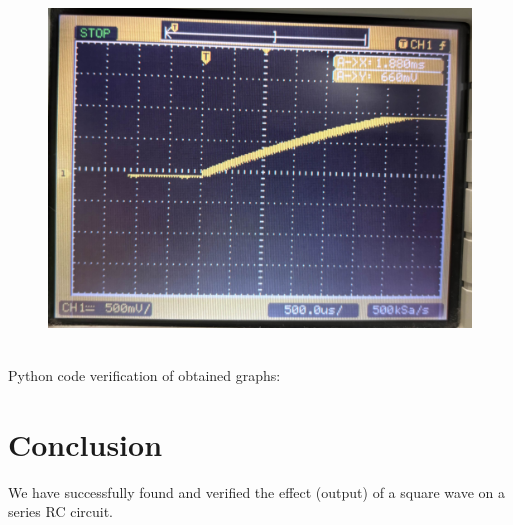 \documentclass[a4paper,12pt]{article}
\begin{document}
\begin{figure}[h!]
	\centering
	\includegraphics[width=0.7\columnwidth]{figs/trans_infty.jpg}
	\label{label}
\end{figure}\\
Python code verification of obtained graphs:\\

\section*{Conclusion}
We have successfully found and verified the effect (output) of a square wave on a series RC circuit.
\end{document}
